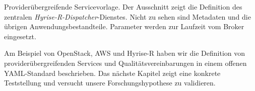 \begin{listing}[ht]	
	\inputminted[firstline=15]{yaml}{./src/hyrise-r.sample.yaml}
	\caption{Providerübergreifende Servicevorlage. Der Ausschnitt zeigt die Definition des zentralen \emph{Hyrise-R-Dispatcher}-Dienstes. Nicht zu sehen sind Metadaten und die übrigen Anwendungsbestandteile. Parameter werden zur Laufzeit vom Broker eingesetzt.}
	\label{listing:hyrise-r}
\end{listing}

\noindent
Am Beispiel von OpenStack, AWS und Hyrise-R haben wir die Definition von providerübergreifenden Services und Qualitätsvereinbarungen in einem offenen YAML-Standard beschrieben. Das nächste Kapitel zeigt eine konkrete Teststellung und versucht unsere Forschungshypothese zu validieren.